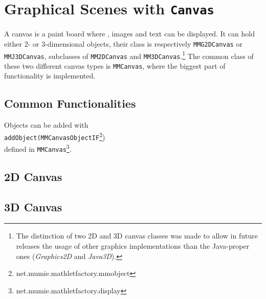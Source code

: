 \section{Graphical Scenes with {\tt Canvas}}
  A canvas is a paint board where \mmos, images and text can be displayed. It can hold either 2- or 3-dimensional
  objects, their class is respectively \verb|MMG2DCanvas| or \verb|MMJ3DCanvas|, subclasses of \verb|MM2DCanvas| and
  \verb|MM3DCanvas|.\footnote{The distinction of two 2D and 3D canvas classes was made to allow in future releases
  the usage of other graphics implementations than the Java-proper ones (\textit{Graphics2D} and \textit{Java3D}).}
  The common class of these two different canvas types is \verb|MMCanvas|, where the biggest part of functionality
  is implemented.\\
  
\subsection{Common Functionalities}
  Objects can be added with\\
  \indent \verb|addObject(MMCanvasObjectIF|\footnote{net.mumie.mathletfactory.mmobject})\\
  defined in \verb|MMCanvas|\footnote{net.mumie.mathletfactory.display}.

\subsection{2D Canvas}

\subsection{3D Canvas}



\newpage
